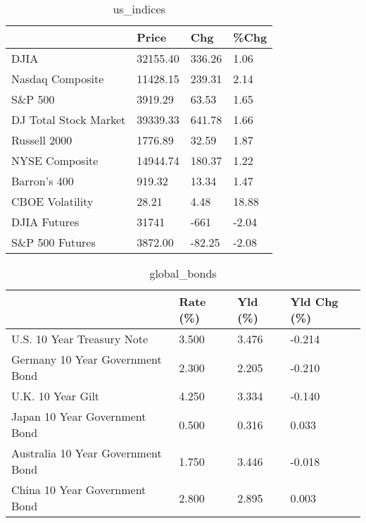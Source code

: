 \documentclass{article}%
\begin{document}
%


\begin{table}[htbp]%
\caption{us\_indices}%
\centering%
\begin{adjustbox}{width=1\textwidth}%
\begin{tabular}{llll}
\toprule
                      &    Price &    Chg &  \%Chg \\
\midrule
                 DJIA & 32155.40 & 336.26 &  1.06 \\
     Nasdaq Composite & 11428.15 & 239.31 &  2.14 \\
              S\&P 500 &  3919.29 &  63.53 &  1.65 \\
DJ Total Stock Market & 39339.33 & 641.78 &  1.66 \\
         Russell 2000 &  1776.89 &  32.59 &  1.87 \\
       NYSE Composite & 14944.74 & 180.37 &  1.22 \\
         Barron's 400 &   919.32 &  13.34 &  1.47 \\
      CBOE Volatility &    28.21 &   4.48 & 18.88 \\
         DJIA Futures &    31741 &   -661 & -2.04 \\
      S\&P 500 Futures &  3872.00 & -82.25 & -2.08 \\
\bottomrule
\end{tabular}
%
\end{adjustbox}%
\end{table}

%


\begin{table}[htbp]%
\caption{global\_bonds}%
\centering%
\begin{adjustbox}{width=1\textwidth}%
\begin{tabular}{llll}
\toprule
                                  & Rate (\%) & Yld (\%) & Yld Chg (\%) \\
\midrule
       U.S. 10 Year Treasury Note &    3.500 &   3.476 &      -0.214 \\
  Germany 10 Year Government Bond &    2.300 &   2.205 &      -0.210 \\
                U.K. 10 Year Gilt &    4.250 &   3.334 &      -0.140 \\
    Japan 10 Year Government Bond &    0.500 &   0.316 &       0.033 \\
Australia 10 Year Government Bond &    1.750 &   3.446 &      -0.018 \\
    China 10 Year Government Bond &    2.800 &   2.895 &       0.003 \\
\bottomrule
\end{tabular}
%
\end{adjustbox}%
\end{table}
\end{document}
